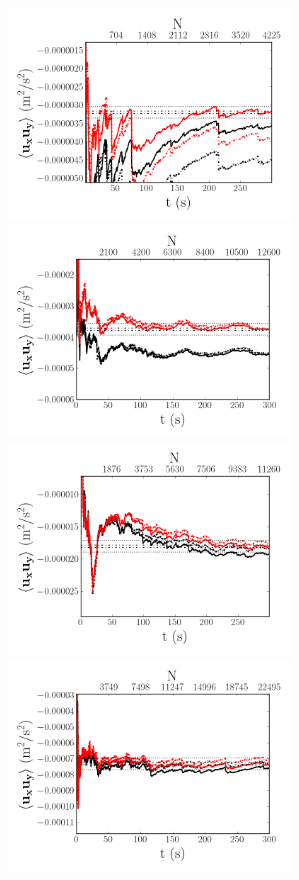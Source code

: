 \documentclass[12pt,oneside,a4paper]{article}
\begin{document}
\begin{figure}
\centering
\includegraphics[width=7.5cm]{images/LDA_timeDependenceImages/4hz_x_400_z_1_uv.png}\hfill
\includegraphics[width=7.5cm]{images/LDA_timeDependenceImages/8hz_x_400_z_1_uv.png}\\
\includegraphics[width=7.5cm]{images/LDA_timeDependenceImages/4hz_x_400_z_15_uv.png}\hfill
\includegraphics[width=7.5cm]{images/LDA_timeDependenceImages/8hz_x_400_z_15_uv.png}\\

\end{figure}
\end{document}
